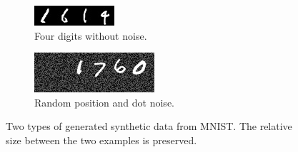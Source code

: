 
\begin{figure}
    \centering
    \begin{subfigure}[b]{0.45\textwidth}
        \centering
        \includegraphics[scale=2.0]{resources/mnist4.jpg}
        \caption{Four digits without noise.
        }
        \label{fig:mnist4}
    \end{subfigure}%
    \begin{subfigure}[b]{0.45\textwidth}
        \centering
        \includegraphics[scale=2.0]{resources/random_pad.jpg}
        \caption{Random position and dot noise.
        }
        \label{fig:mnist_random_pad}
    \end{subfigure}
    \caption{Two types of generated synthetic data from MNIST. The relative size between the two examples is preserved.}
\end{figure}